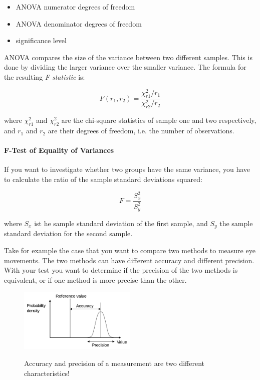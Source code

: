 \begin{itemize}
  \item ANOVA numerator degrees of freedom
  \item ANOVA denominator degrees of freedom
  \item significance level
\end{itemize}

ANOVA compares the size of the variance between two different samples. This is done by dividing the larger variance over the smaller variance. The formula for the resulting \emph{F statistic} is:

\begin{equation}
    F(r_1, r_2) = \frac{\chi_{r1} ^2 /r_1}{\chi_{r2} ^2 /r_2}
\end{equation}

where $\chi_{r1}^2$ and $\chi_{r2}^2$ are the chi-square statistics of sample one and two respectively, and $r_1$ and $r_2$ are their degrees of freedom, i.e. the number of observations.

\paragraph{F-Test of Equality of Variances}
If you want to investigate whether two groups have the same variance, you have to calculate the ratio of the sample standard deviations squared:

\begin{equation}
  F = \frac{S_x^2}{S_y^2}
\end{equation}

where $S_x$ ist he sample standard deviation of the first sample, and $S_y$ the sample standard deviation for the second sample.

Take for example the case that you want to compare two methods to measure eye movements. The two methods
can have different accuracy and different precision. With your test you want to
determine if the precision of the two methods is equivalent, or if one
method is more precise than the other.

\begin{figure}
  \centering
  \includegraphics[width=0.5\textwidth]{../Images/Accuracy_and_precision.png}\\
  \caption{Accuracy and precision of a measurement are two different characteristics!}
\end{figure}


